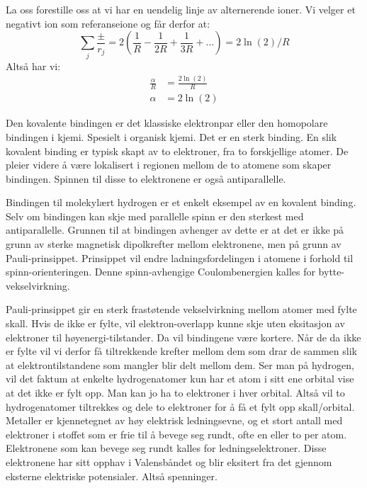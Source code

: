 \documentclass{article}
\begin{document}
\begin{tcolorbox}[breakable,boxrule=0pt]
    La oss forestille oss at vi har en uendelig linje av alternerende ioner. Vi velger et negativt ion som referanseione og får derfor at:
    \begin{equation}
        \sum_j \frac{\pm}{r_j} = 2\left( \frac{1}{R} - \frac{1}{2R} + \frac{1}{3R} + \dots\right) = 2 \ln(2) / R
    \end{equation}
    Altså har vi:
    \begin{align}
        \frac{\alpha}{R} &= \frac{2\ln(2)}{R} \\
        \alpha &= 2 \ln(2)
    \end{align}
\end{tcolorbox}

Den kovalente bindingen er det klassiske elektronpar eller den homopolare bindingen i kjemi. Spesielt i organisk kjemi. Det er en sterk binding. En slik kovalent binding er  typisk skapt av to elektroner, fra to forskjellige atomer. De pleier videre å være lokalisert i regionen mellom de to atomene som skaper bindingen. Spinnen til disse to elektronene er også antiparallelle.

Bindingen til molekylært hydrogen er et enkelt eksempel av en kovalent binding. Selv om bindingen kan skje med parallelle spinn er den sterkest med antiparallelle. Grunnen til at bindingen avhenger av dette er at det er ikke på grunn av sterke magnetisk dipolkrefter mellom elektronene, men på grunn av Pauli-prinsippet. Prinsippet vil endre ladningsfordelingen i atomene i forhold til spinn-orienteringen. Denne spinn-avhengige Coulombenergien kalles for bytte-vekselvirkning.

Pauli-prinsippet gir en sterk frastøtende vekselvirkning mellom atomer med fylte skall. Hvis de ikke er fylte, vil elektron-overlapp kunne skje uten eksitasjon av elektroner til høyenergi-tilstander. Da vil bindingene være kortere. Når de da ikke er fylte vil vi derfor få tiltrekkende krefter mellom dem som drar de sammen slik at elektrontilstandene som mangler blir delt mellom dem. Ser man på hydrogen, vil det faktum at enkelte hydrogenatomer kun har et atom i sitt ene orbital vise at det ikke er fylt opp. Man kan jo ha to elektroner i hver orbital. Altså vil to hydrogenatomer tiltrekkes og dele to elektroner for å få et fylt opp skall/orbital.
Metaller er kjennetegnet av høy elektrisk ledningsevne, og et stort antall med elektroner i stoffet som er frie til å bevege seg rundt, ofte  en eller to per atom. Elektronene som kan bevege seg rundt kalles for ledningselektroner. Disse elektronene har sitt opphav i Valensbåndet og blir eksitert fra det gjennom eksterne elektriske potensialer. Altså spenninger. 
\end{document}
